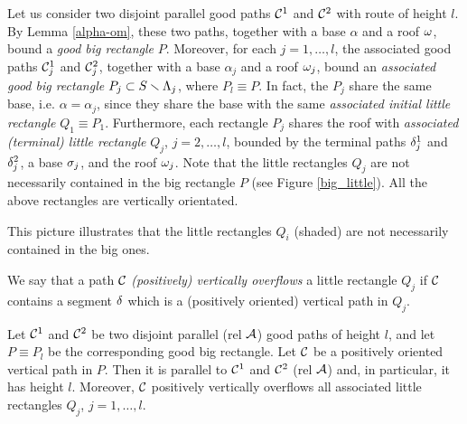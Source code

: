 Let us consider two disjoint parallel good paths ${\cal C}^1$ and ${\cal C}^2$ with route of height $l$.
By Lemma \ref{alpha-om}, these two paths, together with a base  $\alpha$ and a roof ${\omega}$,
bound a {\it good big rectangle} $P$.    
Moreover, for each $j=1,\dots, l$,
the associated good  paths ${\cal C}^1_j$ and ${\cal C}^2_j$, together with a base  $\alpha_j$ and a roof ${\omega}_j$,
bound an {\it associated good big rectangle} $P_j\subset S\smallsetminus {\Lambda}_j$, where $P_l \equiv P$.
In fact, the $P_j$ share the same base, i.e. $\alpha = \alpha_j$, since they share the base with the same 
{\it associated initial little rectangle} $Q_1 \equiv P_1$.  
Furthermore, each rectangle $P_j$ shares the roof with 
{\it associated (terminal) little rectangle} $Q_j$, $j=2,\dots, l$, 
bounded by the terminal paths ${\delta}_j^1$ and ${\delta}^2_j$, a base ${\sigma}_j$,  and the roof ${\omega}_j$.
Note that the little rectangles $Q_j$ are not necessarily contained in the  big rectangle $P$ (see Figure \ref{big_little}).
All the above rectangles are vertically orientated.

%
{This picture illustrates that the little rectangles $Q_i$ (shaded)
   are not necessarily contained in the big ones.}

We say that a path ${\cal C}$ {\it (positively) vertically overflows} a little rectangle $Q_j$ if ${\cal C}$ contains a segment ${\delta}$
which is a (positively oriented) vertical path in $Q_j$. 
 


\begin{lem}\label{good rectangles}
Let ${\cal C}^1$ and ${\cal C}^2$ be two disjoint parallel (rel ${\cal A}$) good paths of height $l$, 
and let $P\equiv P_l$ be the corresponding  good big rectangle.
Let ${\cal C}$ be a positively oriented vertical path in $P$. 
Then it is parallel to ${\cal C}^1$ and ${\cal C}^2$ (rel ${\cal A}$)  
and, in particular, it has height $l$. 
Moreover,  ${\cal C}$ positively vertically overflows all associated little rectangles $Q_j$, $j=1,\dots, l$. 
\end{lem}

